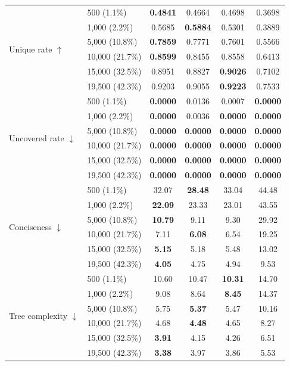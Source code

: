 \begin{table}[t]
{\begin{tabular}{ll cccc}
\midrule
\multirow{6}{*}{Unique rate $\uparrow$}
& 500 (1.1\%)   & \textbf{0.4841} & 0.4664 & 0.4698 & 0.3698 \\
& 1{,}000 (2.2\%)  & 0.5685 & \textbf{0.5884} & 0.5301 & 0.3889 \\
& 5{,}000 (10.8\%) & \textbf{0.7859} & 0.7771 & 0.7601 & 0.5566 \\
& 10{,}000 (21.7\%) & \textbf{0.8599} & 0.8455 & 0.8558 & 0.6413 \\
& 15{,}000 (32.5\%) & 0.8951 & 0.8827 & \textbf{0.9026} & 0.7102 \\
& 19{,}500 (42.3\%) & 0.9203 & 0.9055 & \textbf{0.9223} & 0.7533 \\
\midrule
\multirow{6}{*}{Uncovered rate $\downarrow$}
& 500 (1.1\%)   & \textbf{0.0000} & 0.0136 & 0.0007 & \textbf{0.0000} \\
& 1{,}000 (2.2\%)  & \textbf{0.0000} & 0.0036 & \textbf{0.0000} & \textbf{0.0000} \\
& 5{,}000 (10.8\%) & \textbf{0.0000} & \textbf{0.0000} & \textbf{0.0000} & \textbf{0.0000} \\
& 10{,}000 (21.7\%) & \textbf{0.0000} & \textbf{0.0000} & \textbf{0.0000} & \textbf{0.0000} \\
& 15{,}000 (32.5\%) & \textbf{0.0000} & \textbf{0.0000} & \textbf{0.0000} & \textbf{0.0000} \\
& 19{,}500 (42.3\%) & \textbf{0.0000} & \textbf{0.0000} & \textbf{0.0000} & \textbf{0.0000} \\
\midrule
\multirow{6}{*}{Conciseness $\downarrow$}
& 500 (1.1\%)   & 32.07 & \textbf{28.48} & 33.04 & 44.48 \\
& 1{,}000 (2.2\%)  & \textbf{22.09} & 23.33 & 23.01 & 43.55 \\
& 5{,}000 (10.8\%) & \textbf{10.79} & 9.11\phantom{0} & 9.30\phantom{0} & 29.92 \\
& 10{,}000 (21.7\%) & 7.11\phantom{0} & \textbf{6.08\phantom{0}} & 6.54\phantom{0} & 19.25 \\
& 15{,}000 (32.5\%) & \textbf{5.15\phantom{0}} & 5.18\phantom{0} & 5.48\phantom{0} & 13.02 \\
& 19{,}500 (42.3\%) & \textbf{4.05\phantom{0}} & 4.75\phantom{0} & 4.94\phantom{0} & 9.53\phantom{0} \\
\midrule
\multirow{6}{*}{Tree complexity $\downarrow$}
& 500 (1.1\%)   & 10.60 & 10.47 & \textbf{10.31} & 14.70 \\
& 1{,}000 (2.2\%)  & 9.08\phantom{0} & 8.64\phantom{0} & \textbf{8.45\phantom{0}} & 14.37 \\
& 5{,}000 (10.8\%) & 5.75\phantom{0} & \textbf{5.37\phantom{0}} & 5.47\phantom{0} & 10.16 \\
& 10{,}000 (21.7\%) & 4.68\phantom{0} & \textbf{4.48\phantom{0}} & 4.65\phantom{0} & 8.27\phantom{0} \\
& 15{,}000 (32.5\%) & \textbf{3.91\phantom{0}} & 4.15\phantom{0} & 4.26\phantom{0} & 6.51\phantom{0} \\
& 19{,}500 (42.3\%) & \textbf{3.38\phantom{0}} & 3.97\phantom{0} & 3.86\phantom{0} & 5.53\phantom{0} \\
\bottomrule
\end{tabular}%
}
\end{table}

